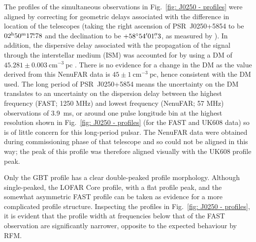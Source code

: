 The profiles of the simultaneous observations in Fig.~\ref{fig: J0250 - profiles} were aligned by correcting for geometric delays associated with the difference in location of the telescopes (taking the right ascension of PSR~J0250+5854 to be $02^\mathrm{h}50^\mathrm{m}17\fs78$ and the declination to be $+58^\circ54'01\hbox{$.\!\!^{\prime\prime}$}3$, as measured by \citealt{TBC+2018}). In addition, the dispersive delay associated with the propagation of the signal through the interstellar medium (ISM) was accounted for by using a DM of $45.281\pm0.003\ \mathrm{cm}^{-3}\ \mathrm{pc}$ \citep{TBC+2018}. There is no evidence for a change in the DM as the value derived from this NenuFAR data is $45\pm1\ \mathrm{cm}^{-3}\ \mathrm{pc}$, hence consistent with the DM used. The long period of PSR~J0250+5854 means the uncertainty on the DM translates to an uncertainty on the dispersion delay between the highest frequency (FAST; 1250 MHz) and lowest frequency (NenuFAR; 57 MHz) observations of 3.9~ms, or around one pulse longitude bin at the highest resolution shown in Fig.~\ref{fig: J0250 - profiles} (for the FAST and UK608 data) so is of little concern for this long-period pulsar. The NenuFAR data were obtained during commissioning phase of that telescope and so could not be aligned in this way; the peak of this profile was therefore aligned visually with the UK608 profile peak.

Only the GBT profile has a clear double-peaked profile morphology. Although single-peaked, the LOFAR Core profile, with a flat profile peak, and the somewhat asymmetric FAST profile can be taken as evidence for a more complicated profile structure. Inspecting the profiles in Fig.~\ref{fig: J0250 - profiles}, it is evident that the profile width at frequencies below that of the FAST observation are significantly narrower, opposite to the expected behaviour by RFM. 

